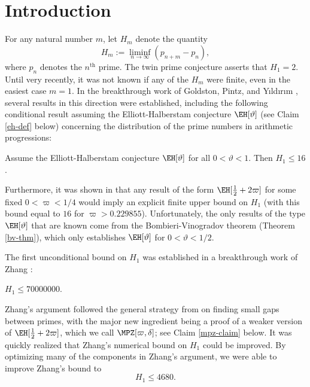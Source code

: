 
\section{Introduction}

For any natural number $m$, let $H_m$ denote the quantity
$$ H_m := \liminf_{n \to \infty} (p_{n+m} - p_n),$$
where $p_n$ denotes the $n^{\operatorname{th}}$ prime.  The twin prime conjecture asserts that $H_1=2$.  Until very recently, it was not known if any of the $H_m$ were finite, even in the easiest case $m=1$.  In the breakthrough work of Goldston, Pintz, and Y{\i}ld{\i}r{\i}m \cite{gpy}, several results in this direction were established, including the following conditional result assuming the Elliott-Halberstam conjecture $\EH[\vartheta]$ (see Claim \ref{eh-def} below) concerning the distribution of the prime numbers in arithmetic progressions:

\begin{theorem}\label{gpy-thm}  Assume the Elliott-Halberstam conjecture $\EH[\vartheta]$ for all $0 < \vartheta < 1$.  Then $H_1 \leq 16$.
\end{theorem}

Furthermore, it was shown in \cite{gpy} that any result of the form $\EH[\frac{1}{2} + 2\varpi]$ for some fixed $0 < \varpi < 1/4$ would imply an explicit finite upper bound on $H_1$ (with this bound equal to $16$ for $\varpi > 0.229855$).  Unfortunately, the only results of the type $\EH[\vartheta]$ that are known come from the Bombieri-Vinogradov theorem (Theorem \ref{bv-thm}), which only establishes $\EH[\vartheta]$ for $0 < \vartheta < 1/2$.

The first unconditional bound on $H_1$ was established  in a breakthrough work of Zhang \cite{zhang}:

\begin{theorem}  $H_1 \leq \num{70000000}$.
\end{theorem}

Zhang's argument followed the general strategy from \cite{gpy} on finding small gaps between primes, with the major new ingredient being a proof of a weaker version of $\EH[\frac{1}{2}+2\varpi]$, which we call $\MPZ[\varpi,\delta]$; see Claim \ref{mpz-claim} below.  It was quickly realized that Zhang's numerical bound on $H_1$ could be improved.  By optimizing many of the components in Zhang's argument, we were able \cite{polymath8a} to improve Zhang's bound to
$$ H_1 \leq \num{4680}.$$

